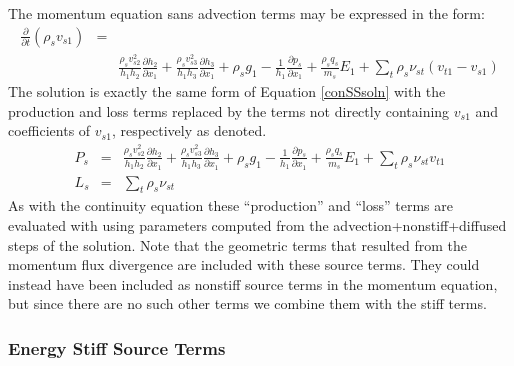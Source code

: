 \documentclass[11pt,letterpaper]{article}
\begin{document}
The momentum equation sans advection terms may be expressed in the form:
\begin{eqnarray}
\frac{\partial}{\partial t} \left( \rho_s v_{s1} \right) &=& \nonumber \\
~ &~& \frac{\rho_s v_{s2}^2}{h_1 h_2} \frac{\partial h_2}{\partial x_1} + \frac{\rho_s v_{s3}^2}{h_1 h_3} \frac{\partial h_3}{\partial x_1}  + \rho_s g_1 - \frac{1}{h_1} \frac{\partial p_s}{\partial x_1} + \frac{\rho_s q_s}{m_s} E_1 + \sum_t \rho_s \nu_{st} \left( v_{t1} - v_{s1} \right)
\end{eqnarray}
The solution is exactly the same form of Equation \ref{conSSsoln} with the production and loss terms replaced by the terms not directly containing $v_{s1}$ and coefficients of $v_{s1}$, respectively as denoted.  
\begin{eqnarray}
P_s &=& \frac{\rho_s v_{s2}^2}{h_1 h_2} \frac{\partial h_2}{\partial x_1} + \frac{\rho_s v_{s3}^2}{h_1 h_3} \frac{\partial h_3}{\partial x_1}  + \rho_s g_1 - \frac{1}{h_1} \frac{\partial p_s}{\partial x_1} + \frac{\rho_s q_s}{m_s} E_1 + \sum_t \rho_s \nu_{st} v_{t1} \nonumber \\
L_s &=& \sum_t \rho_s \nu_{st}
\end{eqnarray}
As with the continuity equation these ``production'' and ``loss'' terms are evaluated with using parameters computed from the advection+nonstiff+diffused steps of the solution.  Note that the geometric terms that resulted from the momentum flux divergence are included with these source terms.  They could instead have been included as nonstiff source terms in the momentum equation, but since there are no such other terms we combine them with the stiff terms.

\subsubsection{Energy Stiff Source Terms}
\end{document}
